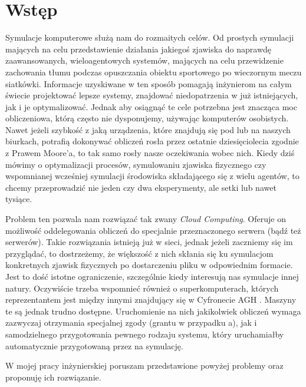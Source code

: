 \chapter{Wstęp}
\label{cha:wstep}
\par Symulacje komputerowe służą nam do rozmaitych celów. Od prostych symulacji mających na celu przedstawienie działania jakiegoś zjawiska do naprawdę zaawansowanych, wieloagentowych systemów, mających na celu przewidzenie zachowania tłumu podczas opuszczania obiektu sportowego po wieczornym meczu siatkówki. Informacje uzyskiwane w ten sposób pomagają inżynierom na całym świecie projektować lepsze systemy, znajdować niedopatrzenia w już istniejących, jak i je optymalizować. Jednak aby osiągnąć te cele potrzebna jest znacząca moc obliczeniowa, którą często nie dysponujemy, używając komputerów osobistych. Nawet jeżeli szybkość z jaką urządzenia, które znajdują się pod lub na naszych biurkach, potrafią dokonywać obliczeń rosła przez ostatnie dziesięciolecia zgodnie z Prawem Moore'a, to tak samo rosły nasze oczekiwania wobec nich. Kiedy dziś mówimy o optymalizacji procesów, symulowaniu zjawiska fizycznego czy wspomnianej wcześniej symulacji środowiska składającego się z wielu agentów, to chcemy przeprowadzić nie jeden czy dwa eksperymenty, ale setki lub nawet tysiące.

\par Problem ten pozwala nam rozwiązać tak zwany \emph{Cloud Computing}. Oferuje on możliwość oddelegowania obliczeń do specjalnie przeznaczonego serwera (bądź też serwerów). Takie rozwiązania istnieją już w sieci, jednak jeżeli zaczniemy się im przyglądać, to dostrzeżemy, że większość z nich skłania się ku symulacjom konkretnych zjawisk fizycznych po dostarczeniu pliku w odpowiednim formacie. Jest to dość istotne ograniczenie, szczególnie kiedy interesują nas symulacje innej natury. Oczywiście trzeba wspomnieć również o superkomputerach, których reprezentantem jest między innymi znajdujący się w Cyfronecie AGH \emph{\prometheusAgh{}}. Maszyny te są jednak trudno dostępne. Uruchomienie na nich jakikolwiek obliczeń wymaga zazwyczaj otrzymania specjalnej zgody (grantu w przypadku \emph{\prometheusAgh{}}a), jak i samodzielnego przygotowania pewnego rodzaju systemu, który uruchamiałby automatycznie przygotowaną przez na symulację.

\par W mojej pracy inżynierskiej poruszam przedstawione powyżej problemy oraz proponuję ich rozwiązanie.


